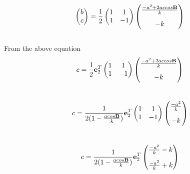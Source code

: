 \documentclass{article}
\let\vec\mathbf
\begin{document}
   \begin{equation}
        \begin{pmatrix}
            b \\
            c \\
        \end{pmatrix}
           =
	   \frac{1}{2}
           \begin{pmatrix}
            1 & 1 \\
	    1 & -1 \\
        \end{pmatrix}
	\begin{pmatrix}   
	\frac{-a^2+2accos\vec{B}}{k} \vspace{3mm}\\
	-k \\                                
	\end{pmatrix}	
	\end{equation}           
   \\  
   From the above equation \\
\begin{equation}
	c
	=
	\frac{1}{2}
	\vec{e}_2^T
\begin{pmatrix}
   1 & 1  \\
   1 & -1 \\
    \end{pmatrix}  
	\begin{pmatrix} 
        \frac{-a^2+2accos\vec{B}}{k} \vspace{3mm}
 \\
         -k \\
	\end{pmatrix}
    \end{equation} \\
\begin{equation}  
	c    
        =
	\frac{1}{2(1-\frac{acos\vec{B}}{k})}
	 \vec{e}_2^T
 \begin{pmatrix} 
       1 & 1  \\
       1 & -1 \\
     \end{pmatrix}
	\begin{pmatrix}
         \frac{-a^2}{k} \vspace{3mm} \\
         -k \\
	\end{pmatrix}
     \end{equation}\\
  \begin{equation}
          c
	  =
         \frac{1}{2(1-\frac{acos\vec{B}}{k})}
	  \vec{e}_2^T
	  \begin{pmatrix}
	  \frac{-a^2}{k}-k \vspace{3mm} \\
             \frac{-a^2}{k}+k
          \end{pmatrix}
  \end{equation}\\
\end{document}
